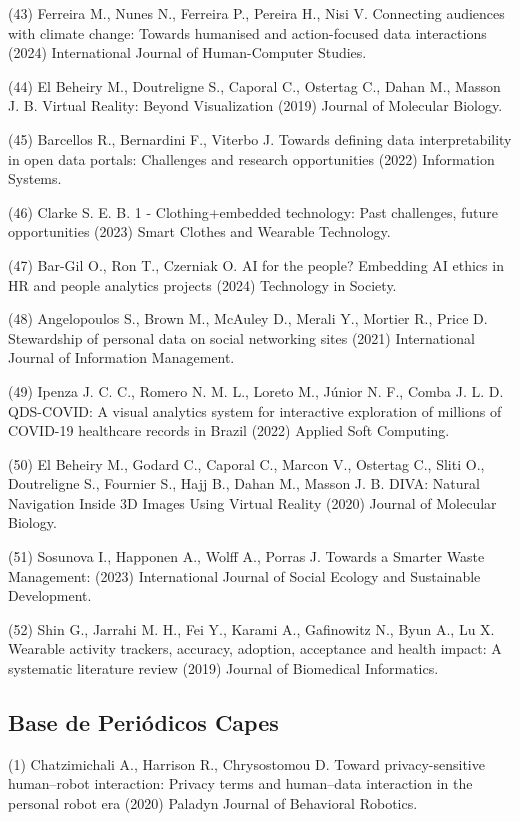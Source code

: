 \documentclass[
	12pt,				%
	oneside,			%
	a4paper,			%
	english,			%
	brazil				%
	]{abntex2ppgsi}
\begin{document}
\begin{apendicesenv}
(43) Ferreira M., Nunes N., Ferreira P., Pereira H., Nisi V. Connecting audiences with climate change: Towards humanised and action-focused data interactions (2024) International Journal of Human-Computer Studies.

(44) El Beheiry M., Doutreligne S., Caporal C., Ostertag C., Dahan M., Masson J. B. Virtual Reality: Beyond Visualization (2019) Journal of Molecular Biology.

(45) Barcellos R., Bernardini F., Viterbo J. Towards defining data interpretability in open data portals: Challenges and research opportunities (2022) Information Systems.

(46) Clarke S. E. B. 1 - Clothing+embedded technology: Past challenges, future opportunities (2023) Smart Clothes and Wearable Technology.

(47) Bar-Gil O., Ron T., Czerniak O. AI for the people? Embedding AI ethics in HR and people analytics projects (2024) Technology in Society.

(48) Angelopoulos S., Brown M., McAuley D., Merali Y., Mortier R., Price D. Stewardship of personal data on social networking sites (2021) International Journal of Information Management.

(49) Ipenza J. C. C., Romero N. M. L., Loreto M., Júnior N. F., Comba J. L. D. QDS-COVID: A visual analytics system for interactive exploration of millions of COVID-19 healthcare records in Brazil (2022) Applied Soft Computing.

(50) El Beheiry M., Godard C., Caporal C., Marcon V., Ostertag C., Sliti O., Doutreligne S., Fournier S., Hajj B., Dahan M., Masson J. B. DIVA: Natural Navigation Inside 3D Images Using Virtual Reality (2020) Journal of Molecular Biology.

(51) Sosunova I., Happonen A., Wolff A., Porras J. Towards a Smarter Waste Management: (2023) International Journal of Social Ecology and Sustainable Development.

(52) Shin G., Jarrahi M. H., Fei Y., Karami A., Gafinowitz N., Byun A., Lu X. Wearable activity trackers, accuracy, adoption, acceptance and health impact: A systematic literature review (2019) Journal of Biomedical Informatics.

\subsection{Base de Periódicos Capes}\label{list:periodicoscapes}

(1) Chatzimichali A., Harrison R., Chrysostomou D. Toward privacy-sensitive human–robot interaction: Privacy terms and human–data interaction in the personal robot era (2020) Paladyn Journal of Behavioral Robotics.


\end{apendicesenv}
\end{document}
